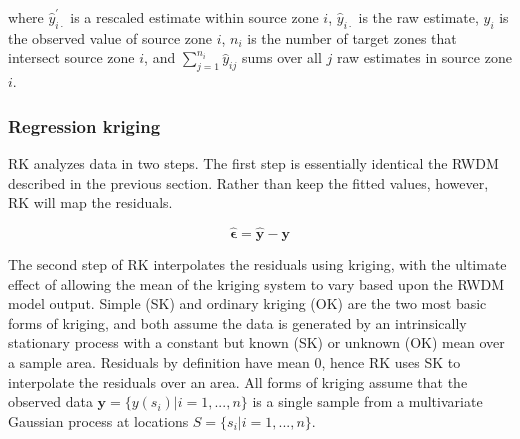 \documentclass[]{interact}
\theoremstyle{plain}%
\theoremstyle{definition}
\theoremstyle{remark}
\begin{document}
where $\hat{y}^{'}_{i\cdot}$ is a rescaled estimate within source zone $i$, $\hat{y}_{i\cdot}$ is the raw estimate, $y_i$ is the observed value of source zone $i$, $n_i$ is the number of target zones that intersect source zone $i$, and $\sum_{j=1}^{n_i} \hat{y}_{ij}$ sums over all $j$ raw estimates in source zone $i$.


\subsubsection{Regression kriging} \label{sec:rk}

RK analyzes data in two steps.  The first step is essentially identical the RWDM described in the previous section.  Rather than keep the fitted values, however, RK will map the residuals.

\[\hat{\bm{\epsilon}} = \hat{\bm{y}} - \bm{y}\]

The second step of RK interpolates the residuals using kriging, with the ultimate effect of allowing the mean of the kriging system to vary based upon the RWDM model output.  Simple (SK) and ordinary kriging (OK) are the two most basic forms of kriging, and both assume the data is generated by an intrinsically stationary process with a constant but known (SK) or unknown (OK) mean over a sample area.  Residuals by definition have mean $0$, hence RK uses SK to interpolate the residuals over an area.  All forms of kriging assume that the observed data $\bm{y}=\{y(s_i) | i=1, ..., n\}$ is a single sample from a multivariate Gaussian process at locations $S=\{s_i | i=1, ..., n\}$.
\end{document}
